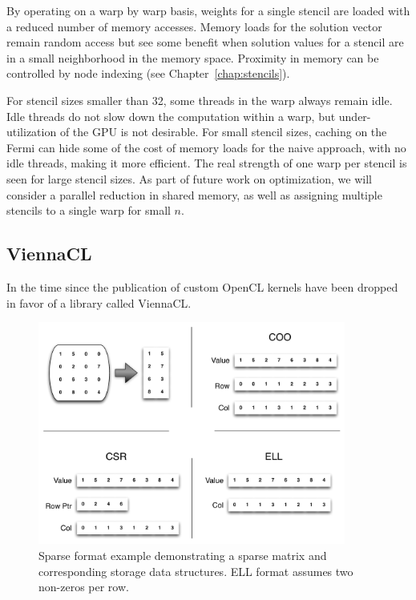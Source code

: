 \documentclass{report}
\begin{document}
By operating on a warp by warp basis, weights for a single stencil are loaded with a reduced number of memory accesses. Memory loads for the solution vector remain random access but see some benefit when solution values for a stencil are in a small neighborhood in the memory space. Proximity in memory can be controlled by node indexing (see Chapter~\ref{chap:stencils}). 

For stencil sizes smaller than 32, some threads in the warp always remain idle. Idle threads do not slow down the computation within a warp, but under-utilization of the GPU is not desirable. For small stencil sizes, caching on the Fermi can hide some of the cost of memory loads for the naive approach, with no idle threads, making it more efficient. The real strength of one warp per stencil is seen for large stencil sizes. 
As part of future work on optimization, we will consider a parallel reduction in shared memory, as well as assigning multiple stencils to a single warp for small  $n$. 





\subsection{ViennaCL} 

In the time since the publication of \cite{BolligFlyerErlebacher2012} custom OpenCL kernels have been dropped in favor of a library called ViennaCL. 

\begin{figure}
\centering
\includegraphics[width=0.9\textwidth]{gpu_content/omnigraffle/SparseStorage.pdf}
\caption{Sparse format example demonstrating a sparse matrix and corresponding storage data structures. ELL format assumes two non-zeros per row. }
\label{fig:sparse_format}
\end{figure}
\end{document}
